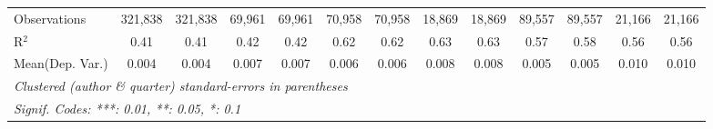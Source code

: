 \begin{tabular}{lcccccccccccc}
   Observations                             & 321,838       & 321,838        & 69,961  & 69,961        & 70,958  & 70,958       & 18,869  & 18,869   & 89,557        & 89,557         & 21,166      & 21,166\\  
   R$^2$                                    & 0.41          & 0.41           & 0.42    & 0.42          & 0.62    & 0.62         & 0.63    & 0.63     & 0.57          & 0.58           & 0.56        & 0.56\\  
Mean(Dep. Var.) & 0.004 & 0.004 & 0.007 & 0.007 & 0.006 & 0.006 & 0.008 & 0.008 & 0.005 & 0.005 & 0.010 & 0.010 \\
   \midrule \midrule
   \multicolumn{13}{l}{\emph{Clustered (author \& quarter) standard-errors in parentheses}}\\
   \multicolumn{13}{l}{\emph{Signif. Codes: ***: 0.01, **: 0.05, *: 0.1}}\\
\end{tabular}
\par\endgroup
